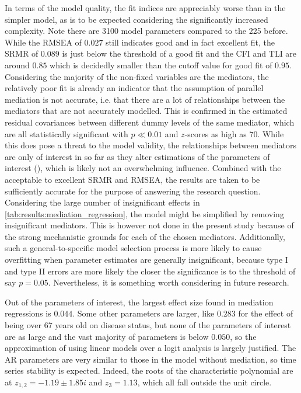 In terms of the model quality, the fit indices are appreciably worse than in the simpler model, as is to be expected
considering the significantly increased complexity. Note there are 3100 model parameters compared to the 225 before.
While the RMSEA of $0.027$ still indicates good and in fact excellent fit, the SRMR of $0.089$ is just below the
threshold of a good fit and the CFI and TLI are around $0.85$ which is decidedly smaller than the cutoff value for
good fit of $0.95$.
Considering the majority of the non-fixed variables are the mediators, the relatively poor fit is already an indicator
that the assumption of parallel mediation is not accurate,
i.e. that there are a lot of relationships between the mediators that are not accurately modelled.
This is confirmed in the estimated residual covariances between different dummy levels of the same mediator,
which are all statistically significant with $p \ll 0.01$ and $z$-scores as high as $70$.
While this does pose a threat to the model validity, the relationships between mediators are only of interest in so far
as they alter estimations of the parameters of interest (),
which is likely not an overwhelming influence.
Combined with the acceptable to excellent SRMR and RMSEA, the results are taken to be sufficiently accurate for the
purpose of answering the research question.
Considering the large number of insignificant effects in \cref{tab:results:mediation_regression}, the model might
be simplified by removing insignificant mediators.
This is however not done in the present study because of the strong mechanistic grounds for each of the chosen mediators.
Additionally, such a general-to-specific model selection process is more likely to cause overfitting when parameter estimates
are generally insignificant, because type I and type II errors are more likely the closer the significance is
to the threshold of say $p = 0.05$.
Nevertheless, it is something worth considering in future research.

Out of the parameters of interest, the largest effect size found in mediation regressions is $0.044$.
Some other parameters are larger, like $0.283$ for the effect of being over 67 years old on disease status,
but none of the parameters of interest are as large and the vast majority of parameters is below $0.050$,
so the approximation of using linear models over a logit analysis is largely justified.
The AR parameters are very similar to those in the model without mediation, so time series stability is expected.
Indeed, the roots of the characteristic polynomial are at $z_{1, 2} = -1.19 \pm 1.85i$ and $z_3 = 1.13$,
which all fall outside the unit circle.

